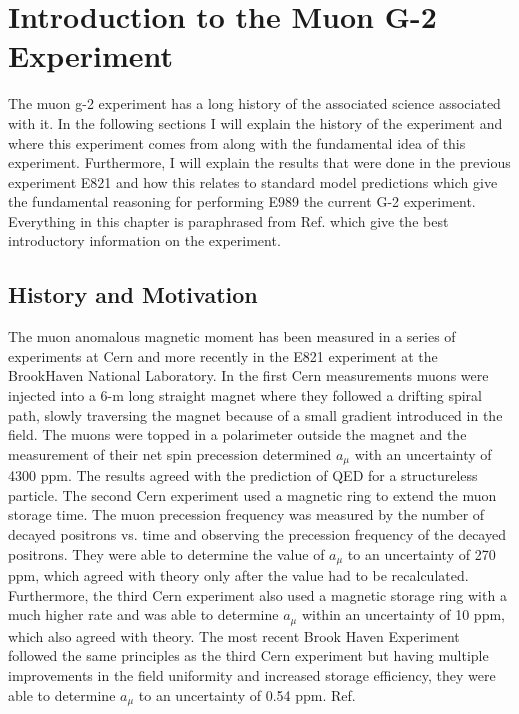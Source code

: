 \documentclass[./Thesis]{subfiles}
\begin{document}
\chapter{Introduction to the Muon G-2 Experiment}

The muon g-2 experiment has a long history of the associated science associated with it. In the following sections I will explain the history of the experiment and where this experiment comes from along with the fundamental idea of this experiment.  Furthermore, I will explain the results that were done in the previous experiment E821 and how this relates to standard model predictions which give the fundamental reasoning for performing E989 the current G-2 experiment. Everything in this chapter is paraphrased from Ref. \cite{TDR} which give the best introductory information on the experiment.

\section{History and Motivation}


The muon anomalous magnetic moment has been measured in a series of experiments at Cern and more recently in the E821 experiment at the BrookHaven National Laboratory. In the first Cern measurements muons were injected into a 6-m long straight magnet where they followed a drifting spiral path, slowly traversing the magnet because of a small gradient introduced in the field. The muons were topped in a polarimeter outside the magnet and the measurement of their net spin precession determined $a_\mu$ with an uncertainty of 4300 ppm. The results agreed with the prediction of QED for a structureless particle. The second Cern experiment used a magnetic ring to extend the muon storage time. The muon precession frequency was measured by the number of decayed positrons vs. time and observing the precession frequency of the decayed positrons. They were able to determine the value of $a_\mu$ to an uncertainty of 270 ppm, which agreed with theory only after the value had to be recalculated. Furthermore, the third Cern experiment also used a magnetic storage ring with a much higher rate and was able to determine $a_\mu$  within an uncertainty of 10 ppm, which also agreed with theory. The most recent Brook Haven Experiment followed the same principles as the third Cern experiment but having multiple improvements in the field uniformity and increased storage efficiency, they were able to determine $a_\mu$  to an uncertainty of 0.54 ppm. Ref. \cite{TDR}
\end{document}
